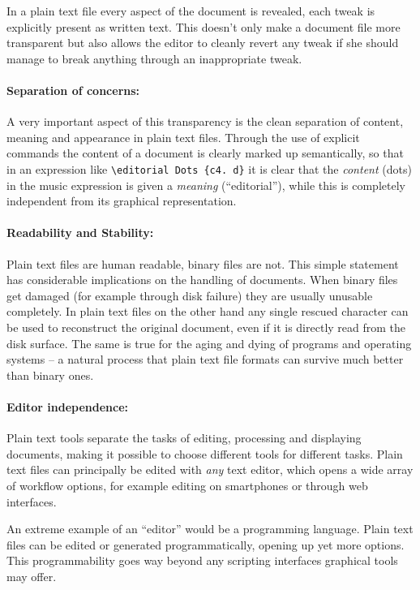 \documentclass[11pt,a4paper]{article}
\begin{document}
In a plain text file every aspect of the document is revealed, each tweak is explicitly
present as written text. This doesn't only make a document file more transparent but also
allows the editor to cleanly revert any tweak if she should manage to break anything
through an inappropriate tweak.

\paragraph{Separation of concerns:}
A very important aspect of this transparency is the clean separation of content, meaning
and appearance in plain text files. Through the use of explicit commands the content
of a document is clearly marked up semantically, so that in an expression like
\texttt{\textbackslash editorial Dots \{c4. d\}} it is clear that the \emph{content} (dots)
in the music expression is given a \emph{meaning} (“editorial”), while this is completely
independent from its graphical representation.

\paragraph{Readability and Stability:}
Plain text files are human readable, binary files are not. This simple statement has
considerable implications on the handling of documents. When binary files get damaged
(for example through disk failure) they are usually unusable completely. In plain text files
on the other hand any single rescued character can be used to reconstruct the original
document, even if it is directly read from the disk surface. The same is true for the
aging and dying of programs and operating systems -- a natural process that plain text
file formats can survive much better than binary ones.

\paragraph{Editor independence:}
Plain text tools separate the tasks of editing, processing and displaying documents,
making it possible to choose different tools for different tasks. Plain text files
can principally be edited with \emph{any} text editor, which opens a wide array of
workflow options, for example editing on smartphones or through web interfaces.

An extreme example of an “editor” would be a programming language. Plain text files can
be edited or generated programmatically, opening up yet more options. This programmability
goes way beyond any scripting interfaces graphical tools may offer.
\end{document}
